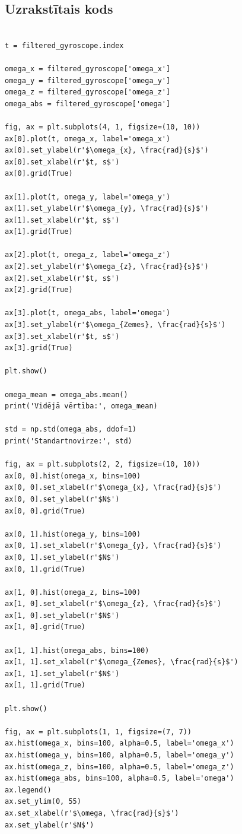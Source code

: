 \documentclass[12pt]{article}
\begin{document}
\subsection*{Uzrakstītais kods}
\begin{center}
    \begin{verbatim}

t = filtered_gyroscope.index

omega_x = filtered_gyroscope['omega_x']
omega_y = filtered_gyroscope['omega_y']
omega_z = filtered_gyroscope['omega_z']
omega_abs = filtered_gyroscope['omega']

fig, ax = plt.subplots(4, 1, figsize=(10, 10))
ax[0].plot(t, omega_x, label='omega_x')
ax[0].set_ylabel(r'$\omega_{x}, \frac{rad}{s}$')
ax[0].set_xlabel(r'$t, s$')
ax[0].grid(True)

ax[1].plot(t, omega_y, label='omega_y')
ax[1].set_ylabel(r'$\omega_{y}, \frac{rad}{s}$')
ax[1].set_xlabel(r'$t, s$')
ax[1].grid(True)

ax[2].plot(t, omega_z, label='omega_z')
ax[2].set_ylabel(r'$\omega_{z}, \frac{rad}{s}$')
ax[2].set_xlabel(r'$t, s$')
ax[2].grid(True)

ax[3].plot(t, omega_abs, label='omega')
ax[3].set_ylabel(r'$\omega_{Zemes}, \frac{rad}{s}$')
ax[3].set_xlabel(r'$t, s$')
ax[3].grid(True)

plt.show()

omega_mean = omega_abs.mean()
print('Vidējā vērtība:', omega_mean)

std = np.std(omega_abs, ddof=1)
print('Standartnovirze:', std)

fig, ax = plt.subplots(2, 2, figsize=(10, 10))
ax[0, 0].hist(omega_x, bins=100)
ax[0, 0].set_xlabel(r'$\omega_{x}, \frac{rad}{s}$')
ax[0, 0].set_ylabel(r'$N$')
ax[0, 0].grid(True)

ax[0, 1].hist(omega_y, bins=100)
ax[0, 1].set_xlabel(r'$\omega_{y}, \frac{rad}{s}$')
ax[0, 1].set_ylabel(r'$N$')
ax[0, 1].grid(True)

ax[1, 0].hist(omega_z, bins=100)
ax[1, 0].set_xlabel(r'$\omega_{z}, \frac{rad}{s}$')
ax[1, 0].set_ylabel(r'$N$')
ax[1, 0].grid(True)

ax[1, 1].hist(omega_abs, bins=100)
ax[1, 1].set_xlabel(r'$\omega_{Zemes}, \frac{rad}{s}$')
ax[1, 1].set_ylabel(r'$N$')
ax[1, 1].grid(True)

plt.show()

fig, ax = plt.subplots(1, 1, figsize=(7, 7))
ax.hist(omega_x, bins=100, alpha=0.5, label='omega_x')
ax.hist(omega_y, bins=100, alpha=0.5, label='omega_y')
ax.hist(omega_z, bins=100, alpha=0.5, label='omega_z')
ax.hist(omega_abs, bins=100, alpha=0.5, label='omega')
ax.legend()
ax.set_ylim(0, 55)
ax.set_xlabel(r'$\omega, \frac{rad}{s}$')
ax.set_ylabel(r'$N$')

    \end{verbatim}
\end{center}
\end{document}
